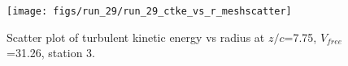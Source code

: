 \begin{figure}[H]
\centering
\texttt{[image: figs/run\_29/run\_29\_ctke\_vs\_r\_meshscatter]}
\caption{Scatter plot of turbulent kinetic energy vs radius at $z/c$=7.75, $V_{free}$=31.26, station 3.}
\label{fig:run_29_ctke_vs_r_meshscatter}
\end{figure}


